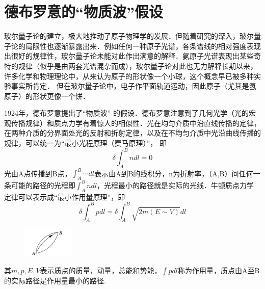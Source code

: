 \section[德布罗意的“物质波”假设]{德布罗意的“物质波”假设}\label{sec:01.05}

玻尔量子论的建立，极大地推动了原子物理学的发展．但随着研究的深入，玻尔量子论的局限性也逐渐暴露出来．例如任何一种原子光谱，各条谱线的相对强度表现出很好的规律性，玻尔量子论未能对此作出满意的解释．氨原子光谱表现出某些奇特的规律（似乎是由两套光谱混杂而成），玻尔量子论对此也无力解释长期以来，许多化学和物理理论中，从来认为原子的形状像一个小球，这个概念早已被多种实验事实所肯定． 但在玻尔量子论中，电子作平面轨道运动，因此原子（尤其是氢原子）的形状更像一个饼．

1924年，德布罗意提出了“物质波” 的假设．德布罗意注意到了几何光学（光的宏观传播规律）和质点力学有着惊人的相似性．光在均匀介质中沿直线传播的定律，在两种介质的分界面处光的反射和折射定律，以及在不均匀介质中光沿曲线传播的规律，可以统一为“最小光程原理（费马原理）”， 即
\eqshort
\begin{equation}\label{eq15.1}
	\delta\int_{A}^{B} ndl = 0
\end{equation}\eqnormal
光由A点传播到B点，$\int_{A}^{B}\cdots dl$表示由A到B的线积分，n为折射率，（A,B）间任何一条可能的路径的光程即$\int_{A}^{B}ndl$，光程最小的路径就是实际的光线．牛顿质点力学定律可以表示成“最小作用量原理”，即
\begin{equation}\label{eq15.2}
	\delta\int_{A}^{B}pdl=\delta\int_{A}^{B}\sqrt{2m(E\sim V)}dl
\end{equation}\eqlong
\begin{figure}
	\centering
	\includegraphics[width=2.5cm,clip]{QM file/figure/1-7}
	\caption{}
	\label{fig.1-7}
\end{figure}
其$m,p,E,V$表示质点的质量，动量，总能和势能，$\int pdl$称为作用量，质点由A至B的实际路径是作用量最小的路径.

